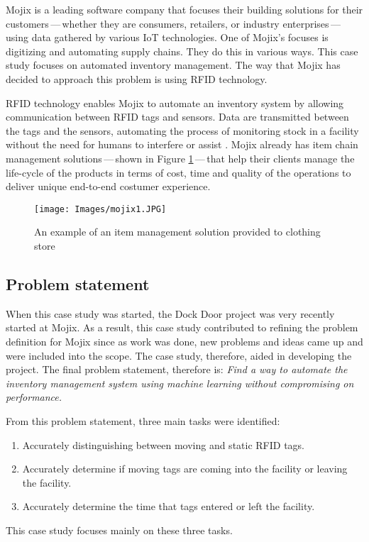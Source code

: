 \documentclass{article}
\begin{document}
Mojix is a leading software company that focuses their building solutions for their customers\,---\,whether they are consumers, retailers, or industry enterprises\,---\,using data gathered by various \ac{IoT} technologies.
One of Mojix's focuses is digitizing and automating supply chains.
They do this in various ways.
This case study focuses on automated inventory management.
The way that Mojix has decided to approach this problem is using \ac{RFID} technology.

\ac{RFID} technology enables Mojix to automate an inventory system by allowing communication between \ac{RFID} tags and sensors.
Data are transmitted between the tags and the sensors, automating the process of monitoring stock in a facility without the need for humans to interfere or assist \citep{ref:about_mojix}.
Mojix already has item chain management solutions\,---\,shown in Figure \ref{fig:item_management_sol}\,---\,that help their clients manage the life-cycle of the products in terms of cost, time and quality of the operations to deliver unique end-to-end costumer experience.
%
\begin{figure}[h]
    \centering
    \texttt{[image: Images/mojix1.JPG]}
    \caption{An example of an item management solution provided to clothing store \citep{ref:solutions_consultant}}
    \label{fig:item_management_sol}
\end{figure}
%

\subsection{Problem statement}

When this case study was started, the Dock Door project was very recently started at Mojix.
As a result, this case study contributed to refining the problem definition for Mojix since as work was done, new problems and ideas came up and were included into the scope.
The case study, therefore, aided in developing the project.
The final problem statement, therefore is:
\textit{Find a way to automate the inventory management system using machine learning without compromising on performance.}

From this problem statement, three main tasks were identified:
\begin{enumerate}
    \item Accurately distinguishing between moving and static \ac{RFID} tags.
    \item Accurately determine if moving tags are coming into the facility or leaving the facility.
    \item Accurately determine the time that tags entered or left the facility.
\end{enumerate}
This case study focuses mainly on these three tasks.
\end{document}

